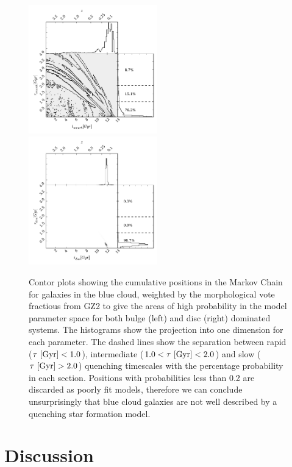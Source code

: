 \documentclass[useAMS,usenatbib]{mn2e}
\def\changed    {\color{titlecol} }
\begin{document}
\begin{figure}
\includegraphics[width=0.4975\textwidth]{blue_smooth.pdf}
\includegraphics[width=0.4975\textwidth]{blue_disc.pdf}
\caption[8pt]{{\changed Contor plots showing the cumulative positions in the Markov Chain for galaxies in the blue cloud, weighted by the morphological vote fractious from GZ2 to give the areas of high probability in the model parameter space for both bulge (left) and disc (right) dominated systems. The histograms show the projection into one dimension for each parameter. The dashed lines show the separation between rapid ($\tau ~\rm{[Gyr]} < 1.0$), intermediate ($1.0 < \tau ~\rm{[Gyr]} < 2.0$) and slow ($\tau ~\rm{[Gyr]} > 2.0$) quenching timescales with the percentage probability in each section. Positions with probabilities less than 0.2 are discarded as poorly fit models, therefore we can conclude unsurprisingly that blue cloud galaxies are not well described by a quenching star formation model. }}
\label{blue_c}
\end{figure}

\section{Discussion}\label{diss}
\end{document}
